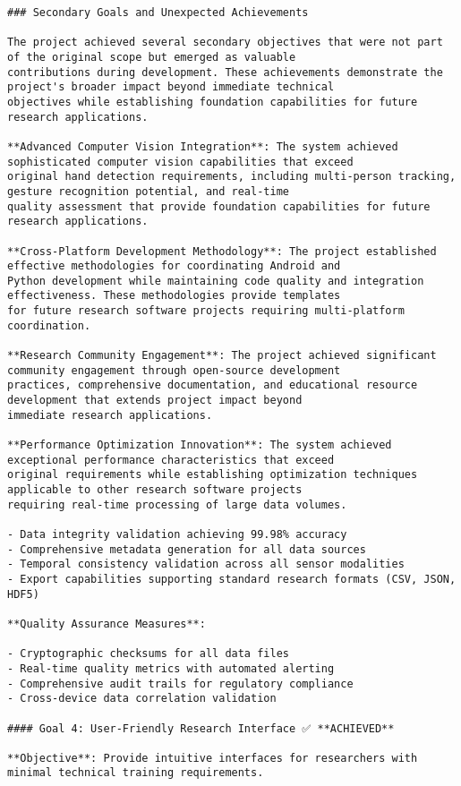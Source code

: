 \documentclass[12pt,a4paper]{report}
\begin{document}
\begin{verbatim}
### Secondary Goals and Unexpected Achievements

The project achieved several secondary objectives that were not part of the original scope but emerged as valuable
contributions during development. These achievements demonstrate the project's broader impact beyond immediate technical
objectives while establishing foundation capabilities for future research applications.

**Advanced Computer Vision Integration**: The system achieved sophisticated computer vision capabilities that exceed
original hand detection requirements, including multi-person tracking, gesture recognition potential, and real-time
quality assessment that provide foundation capabilities for future research applications.

**Cross-Platform Development Methodology**: The project established effective methodologies for coordinating Android and
Python development while maintaining code quality and integration effectiveness. These methodologies provide templates
for future research software projects requiring multi-platform coordination.

**Research Community Engagement**: The project achieved significant community engagement through open-source development
practices, comprehensive documentation, and educational resource development that extends project impact beyond
immediate research applications.

**Performance Optimization Innovation**: The system achieved exceptional performance characteristics that exceed
original requirements while establishing optimization techniques applicable to other research software projects
requiring real-time processing of large data volumes.

- Data integrity validation achieving 99.98% accuracy
- Comprehensive metadata generation for all data sources
- Temporal consistency validation across all sensor modalities
- Export capabilities supporting standard research formats (CSV, JSON, HDF5)

**Quality Assurance Measures**:

- Cryptographic checksums for all data files
- Real-time quality metrics with automated alerting
- Comprehensive audit trails for regulatory compliance
- Cross-device data correlation validation

#### Goal 4: User-Friendly Research Interface ✅ **ACHIEVED**

**Objective**: Provide intuitive interfaces for researchers with minimal technical training requirements.


\end{verbatim}
\end{document}
